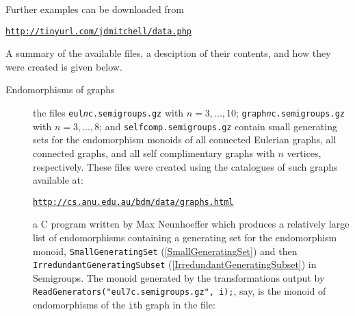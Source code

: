 \documentclass[a4paper,11pt]{report}
\begin{document}
{{ Further examples can be downloaded from \vspace{\baselineskip}

 \href{http://tinyurl.com/jdmitchell/data.php} {\texttt{http://tinyurl.com/jdmitchell/data.php}}\vspace{\baselineskip}

 \noindent A summary of the available files, a desciption of their contents, and how they
were created is given below.

 
\begin{description}
\item[{Endomorphisms of graphs}]  the files \texttt{eul\mbox{\texttt{\mdseries\slshape n}}c.semigroups.gz} with $n=3,...,10$; \texttt{graph\mbox{\texttt{\mdseries\slshape n}}c.semigroups.gz} with $n=3,...,8$; and \texttt{selfcomp.semigroups.gz} contain small generating sets for the endomorphism monoids of all connected
Eulerian graphs, all connected graphs, and all self complimentary graphs with $n$ vertices, respectively. These files were created using the catalogues of such
graphs available at:

 \href{http://cs.anu.edu.au/~bdm/data/graphs.html} {\texttt{http://cs.anu.edu.au/\texttt{}bdm/data/graphs.html}}

 a C program written by Max Neunhoeffer which produces a relatively large list
of endomorphisms containing a generating set for the endomorphism monoid, \texttt{SmallGeneratingSet} (\ref{SmallGeneratingSet}) and then \texttt{IrredundantGeneratingSubset} (\ref{IrredundantGeneratingSubset}) in \textsf{Semigroups}. The monoid generated by the transformations output by \texttt{ReadGenerators("eul7c.semigroups.gz", i);}, say, is the monoid of endomorphisms of the \texttt{i}th graph in the file:


\end{description}}}
\end{document}
